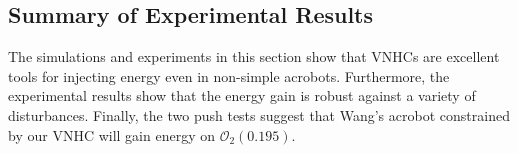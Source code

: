 \subsection{Summary of Experimental Results}
The simulations and experiments in this section show that VNHCs are excellent
tools for injecting energy even in non-simple acrobots. 
Furthermore, the experimental results show that the energy gain is robust
against a variety of disturbances.
Finally, the two push tests suggest that Wang's acrobot constrained by our VNHC
will gain energy on \(\mathcal{O}_2(0.195)\).

